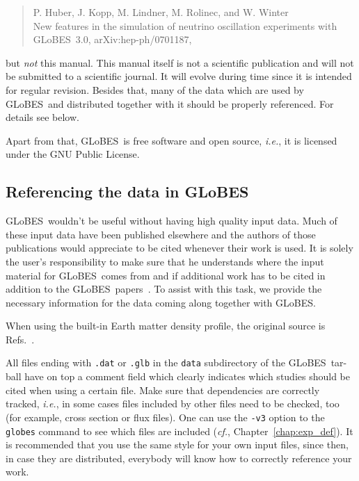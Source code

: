 \documentclass[a4paper,12pt,twoside]{book}
\newcommand{\glbxxxtwo}{hep-ph/0701187}
\newcommand{\ie}{{\it i.e.}}
\newcommand{\cf}{{\it cf.}}
\newcommand{\Refs}{Refs.}
\newcommand{\Chapt}{Chapter}
\newcommand{\GLOBES}{{\sf GLoBES}}
\begin{document}
\begin{quote}
P. Huber, J. Kopp, M. Lindner, M. Rolinec, and W. Winter\\
 New features in the simulation of neutrino oscillation experiments with \GLOBES~3.0,
arXiv:\glbxxxtwo,
\end{quote}
but \emph{not} this manual. This manual itself is not a scientific 
publication and will not be submitted to a scientific journal. 
It will evolve during time since it is intended for 
regular revision. Besides that, many of the data which are used by \GLOBES\ 
and distributed together with it should be properly referenced. 
For details see below.

Apart from that, \GLOBES\ is free software and open source, \ie, it is 
licensed under the GNU Public License.

\subsection*{Referencing the data in \GLOBES}
\label{ref_data}

\index{norm}{Referencing!data in \GLOBES}
\GLOBES\ wouldn't be useful without having high quality input data.
Much of these input data have been published elsewhere and the authors
of those publications would appreciate to be cited whenever their work
is used. It is solely the user's responsibility 
to make sure that he understands where the input material for \GLOBES\ comes
from and if additional work has to be cited in addition to the 
\GLOBES\ papers~\cite{globes_paper,globes_paper_two}. To assist with this task, we provide  the necessary information for the data coming along together with \GLOBES.

When using the built-in Earth matter density profile, the 
original source is \Refs~\cite{Dziewonski:1981xy,Stacey}.

All files ending with \verb+.dat+ or \verb+.glb+ 
in the \verb+data+ subdirectory of the \GLOBES\ tar-ball have on top a comment field which clearly indicates which studies should be
cited when using a certain file. Make sure that dependencies are correctly
tracked, \ie , in some cases files included by other files need to be 
checked, too (for example, cross section or flux files). One can use 
the \verb+-v3+ option to the \verb+globes+ command to see which files
are included (\cf, \Chapt~\ref{chap:exp_def}).
It is recommended that you use the same style for your own input files, since then, in case they are distributed, everybody will know how to correctly reference your work.
\end{document}
